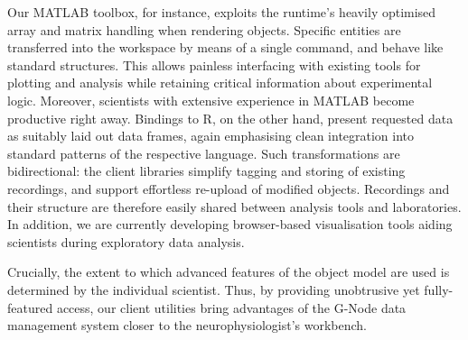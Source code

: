 \documentclass[a4paper]{article}
\begin{document}
Our MATLAB toolbox, for instance, exploits the runtime's heavily
optimised array and matrix handling when rendering objects. Specific
entities are transferred into the workspace by means of a single
command, and behave like standard structures. This allows painless
interfacing with existing tools for plotting and analysis while
retaining critical information about experimental logic. Moreover,
scientists with extensive experience in MATLAB become productive right
away. Bindings to R, on the other hand, present requested data as
suitably laid out data frames, again emphasising clean integration
into standard patterns of the respective language. Such
transformations are bidirectional: the client libraries simplify
tagging and storing of existing recordings, and support effortless
re-upload of modified objects. Recordings and their structure are
therefore easily shared between analysis tools and laboratories. In
addition, we are currently developing browser-based visualisation
tools aiding scientists during exploratory data analysis.

Crucially, the extent to which advanced features of the object model
are used is determined by the individual scientist. Thus, by providing
unobtrusive yet fully-featured access, our client utilities bring
advantages of the G-Node data management system closer to the
neurophysiologist's workbench.
\end{document}
